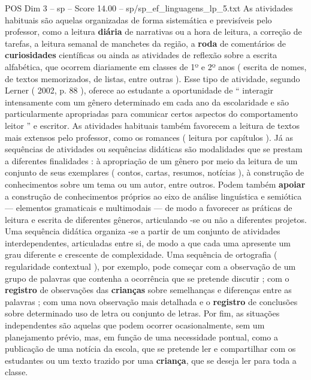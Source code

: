 \begin{textsample}{POS Dim 3 – sp – Score 14.00 – sp/sp\_ef\_linguagens\_lp\_5.txt}  \label{ex:f3_pos_208}
As atividades habituais são aquelas organizadas de forma sistemática e previsíveis pelo professor, como a leitura \textbf{diária} de narrativas ou a hora de leitura, a correção de tarefas, a leitura semanal de manchetes da região, a \textbf{roda} de comentários de \textbf{curiosidades} científicas ou ainda as atividades de reflexão sobre a escrita alfabética, que ocorrem diariamente em classes de 1º e 2º anos ( escrita de nomes, de textos memorizados, de listas, entre outras ).
Esse tipo de atividade, segundo Lerner ( 2002, p. 88 ), oferece ao estudante a oportunidade de “ interagir intensamente com um gênero determinado em cada ano da escolaridade e são particularmente apropriadas para comunicar certos aspectos do comportamento leitor ” e escritor.
As atividades habituais também favorecem a leitura de textos mais extensos pelo professor, como os romances ( leitura por capítulos ).
Já as sequências de atividades ou sequências didáticas são modalidades que se prestam a diferentes finalidades : à apropriação de um gênero por meio da leitura de um conjunto de seus exemplares ( contos, cartas, resumos, notícias ), à construção de conhecimentos sobre um tema ou um autor, entre outros.
Podem também \textbf{apoiar} a construção de conhecimentos próprios ao eixo de análise linguística e semiótica — elementos gramaticais e multimodais — de modo a favorecer as práticas de leitura e escrita de diferentes gêneros, articulando -se ou não a diferentes projetos.
Uma sequência didática organiza -se a partir de um conjunto de atividades interdependentes, articuladas entre si, de modo a que cada uma apresente um grau diferente e crescente de complexidade.
Uma sequência de ortografia ( regularidade contextual ), por exemplo, pode começar com a observação de um grupo de palavras que contenha a ocorrência que se pretende discutir ; com o \textbf{registro} de observações das \textbf{crianças} sobre semelhanças e diferenças entre as palavras ; com uma nova observação mais detalhada e o \textbf{registro} de conclusões sobre determinado uso de letra ou conjunto de letras.
Por fim, as situações independentes são aquelas que podem ocorrer ocasionalmente, sem um planejamento prévio, mas, em função de uma necessidade pontual, como a publicação de uma notícia da escola, que se pretende ler e compartilhar com os estudantes ou um texto trazido por uma \textbf{criança}, que se deseja ler para toda a classe.

\end{textsample}
